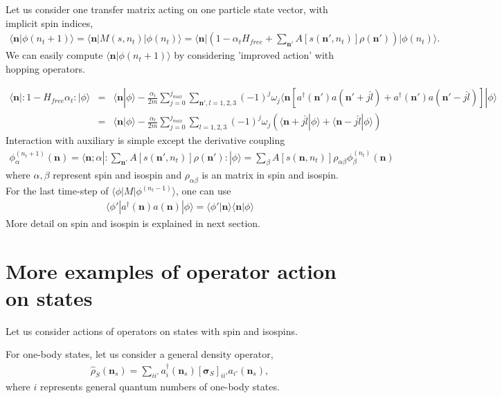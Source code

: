 \documentclass[10pt]{book}
\def\bm{\boldsymbol}
\newcommand{\bea}{\begin{eqnarray}}
\newcommand{\eea}{\end{eqnarray}}
\newcommand{\no}{\nonumber \\}
\def\vs{{\bm \sigma}}
\def\vn{{\bm n}}
\def\la{\langle}
\def\ra{\rangle}
\begin{document}
Let us consider one transfer matrix acting on one particle state vector,
with implicit spin indices,
\bea 
\la \vn|\phi(n_t+1)\ra=\la \vn| M(s,n_t) |\phi(n_t)\ra
=\la \vn|\left(1-\alpha_t H_{free}+\sum_{\vn'}A[s(\vn',n_t)]\rho(\vn')\right)
|\phi(n_t)\ra.
\eea  
We can easily compute $\la \vn|\phi(n_t+1)\ra$ by considering 'improved action'
with hopping operators.

\bea 
\la {\bm n}|:1-H_{free}\alpha_t:|\phi\ra 
&=&\la {\bm n}|\phi\ra -\frac{\alpha_t}{2m} \sum_{j=0}^{j_{max}}\sum_{\vn',l=1,2,3}
(-1)^j \omega_j \la {\bm n}[a^\dagger(\vn')a(\vn'+j\hat{l})+a^\dagger(\vn')a(\vn'-j\hat{l})]|\phi\ra \no 
&=&\la {\bm n}|\phi\ra -\frac{\alpha_t}{2m} \sum_{j=0}^{j_{max}}\sum_{l=1,2,3}
(-1)^j \omega_j \left( \la {\bm n}+j\hat{l}|\phi\ra +\la {\bm n}-j\hat{l}|\phi\ra   \right) 
\eea 
Interaction with auxiliary is simple except the derivative coupling
\bea 
\phi^{(n_t+1)}_{\alpha}({\bm n}) =\la {\bm n};\alpha|: \sum_{\vn'}A[s(\vn',n_t)]\rho(\vn'): |\phi\ra 
 =\sum_{\beta} A[s(\vn,n_t)] \rho_{\alpha \beta}\phi_{\beta}^{(n_t)}({\bm n}) 
\eea 
where $\alpha,\beta$ represent spin and isospin and $\rho_{\alpha\beta}$ is an matrix in spin and 
isospin. For the last time-step of $\la \phi|M|\phi^{(n_t-1)}\ra$,
one can use
\bea 
\la \phi'|a^\dagger(\vn) a(\vn)|\phi\ra
=\la \phi'|\vn\ra \la \vn|\phi\ra  
\eea 
More detail on spin and isospin is explained in next section. 
\section{More examples of operator action on states}
Let us consider actions of operators on states with spin and isospins.

For one-body states, let us consider a general density operator,
\bea 
\hat{\rho}_{S}(\vn_s)=\sum_{ii'} a^\dagger_{i}(\vn_s)[\vs_S]_{ii'}
                 a_{i'}(\vn_s),
\eea 
where $i$ represents general quantum numbers of one-body states.
\end{document}

